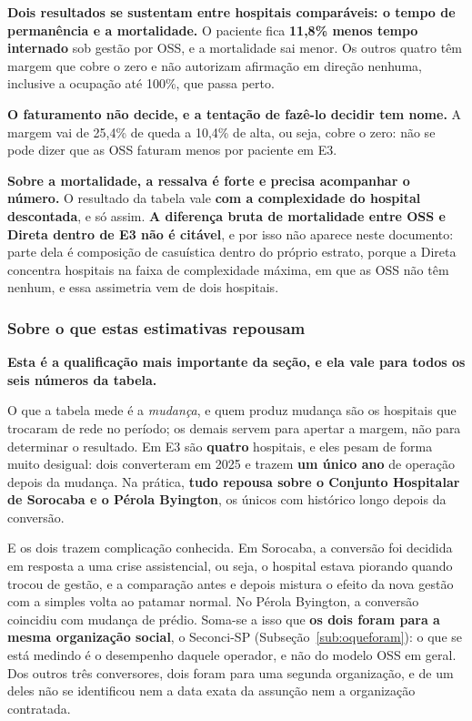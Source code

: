 \textbf{Dois resultados se sustentam entre hospitais comparáveis: o tempo
de permanência e a mortalidade.} O paciente fica \textbf{11,8\% menos tempo
internado} sob gestão por OSS, e a mortalidade sai menor. Os outros quatro
têm margem que cobre o zero e não autorizam afirmação em direção nenhuma,
inclusive a ocupação até 100\%, que passa perto.

\textbf{O faturamento não decide, e a tentação de fazê-lo decidir tem
nome.} A margem vai de 25,4\% de queda a 10,4\% de alta, ou seja, cobre o
zero: não se pode dizer que as OSS faturam menos por paciente em E3.

\textbf{Sobre a mortalidade, a ressalva é forte e precisa acompanhar o
número.} O resultado da tabela vale \textbf{com a complexidade do hospital
descontada}, e só assim. \textbf{A diferença bruta de mortalidade entre OSS
e Direta dentro de E3 não é citável}, e por isso não aparece neste
documento: parte dela é composição de casuística dentro do próprio estrato,
porque a Direta concentra hospitais na faixa de complexidade máxima, em que
as OSS não têm nenhum, e essa assimetria vem de dois hospitais.

\subsubsection*{Sobre o que estas estimativas repousam}

\textbf{Esta é a qualificação mais importante da seção, e ela vale para
todos os seis números da tabela.}

O que a tabela mede é a \emph{mudança}, e quem produz mudança são os
hospitais que trocaram de rede no período; os demais servem para apertar a
margem, não para determinar o resultado. Em E3 são \textbf{quatro}
hospitais, e eles pesam de forma muito desigual: dois converteram em 2025 e
trazem \textbf{um único ano} de operação depois da mudança. Na prática,
\textbf{tudo repousa sobre o Conjunto Hospitalar de Sorocaba e o Pérola
Byington}, os únicos com histórico longo depois da conversão.

E os dois trazem complicação conhecida. Em Sorocaba, a conversão foi
decidida em resposta a uma crise assistencial, ou seja, o hospital estava
piorando quando trocou de gestão, e a comparação antes e depois mistura o
efeito da nova gestão com a simples volta ao patamar normal. No Pérola
Byington, a conversão coincidiu com mudança de prédio. Soma-se a isso que
\textbf{os dois foram para a mesma organização social}, o Seconci-SP
(Subseção~\ref{sub:oqueforam}): o que se está medindo é o desempenho
daquele operador, e não do modelo OSS em geral. Dos outros três
conversores, dois foram para uma segunda organização, e de um deles não se
identificou nem a data exata da assunção nem a organização contratada.

